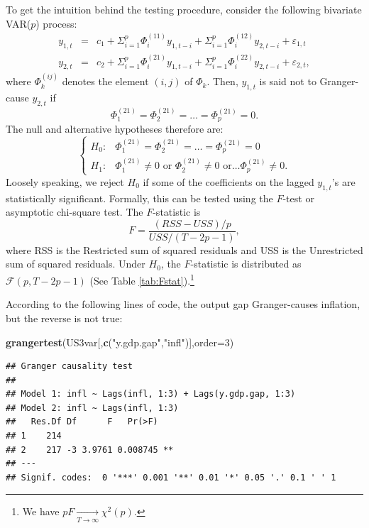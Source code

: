 \documentclass[
  12pt,
]{book}
\newenvironment{Shaded}{\begin{snugshade}}{\end{snugshade}}
\newcommand{\AttributeTok}[1]{\textcolor[rgb]{0.13,0.29,0.53}{#1}}
\newcommand{\DecValTok}[1]{\textcolor[rgb]{0.00,0.00,0.81}{#1}}
\newcommand{\FunctionTok}[1]{\textcolor[rgb]{0.13,0.29,0.53}{\textbf{#1}}}
\newcommand{\NormalTok}[1]{#1}
\newcommand{\StringTok}[1]{\textcolor[rgb]{0.31,0.60,0.02}{#1}}
\theoremstyle{definition}
\theoremstyle{definition}
\theoremstyle{definition}
\theoremstyle{definition}
\theoremstyle{remark}
\begin{document}
To get the intuition behind the testing procedure, consider the following
bivariate VAR(\(p\)) process:
\begin{eqnarray*}
y_{1,t} & = & c_1+\Sigma_{i=1}^{p}\Phi_i^{(11)}y_{1,t-i}+\Sigma_{i=1}^{p}\Phi_i^{(12)}y_{2,t-i}+\varepsilon_{1,t}\\
y_{2,t} & = & c_2+\Sigma_{i=1}^{p}\Phi_i^{(21)}y_{1,t-i}+\Sigma_{i=1}^{p}\Phi_i^{(22)}y_{2,t-i}+\varepsilon_{2,t},
\end{eqnarray*}
where \(\Phi_k^{(ij)}\) denotes the element \((i,j)\) of \(\Phi_k\). Then, \(y_{1,t}\) is said not to Granger-cause \(y_{2,t}\) if
\[
\Phi_1^{(21)}=\Phi_2^{(21)}=\ldots=\Phi_p^{(21)}=0.
\]
The null and alternative hypotheses therefore are:
\[
\begin{cases}
H_{0}: & \Phi_1^{(21)}=\Phi_2^{(21)}=\ldots=\Phi_p^{(21)}=0\\
H_{1}: & \Phi_1^{(21)}\neq0\mbox{ or }\Phi_2^{(21)}\neq0\mbox{ or}\ldots\Phi_p^{(21)}\neq0.\end{cases}
\]
Loosely speaking, we reject \(H_{0}\) if some of the coefficients on the lagged \(y_{1,t}\)'s are statistically significant. Formally, this can be tested using the \(F\)-test or asymptotic chi-square test. The \(F\)-statistic is
\[
F=\frac{(RSS-USS)/p}{USS/(T-2p-1)},
\]
where RSS is the Restricted sum of squared residuals and USS is the Unrestricted sum of squared residuals. Under \(H_{0}\), the \(F\)-statistic is distributed as \(\mathcal{F}(p,T-2p-1)\) (See Table \ref{tab:Fstat}).\footnote{We have \(pF\underset{T \rightarrow \infty}{\rightarrow}\chi^{2}(p)\).}

According to the following lines of code, the output gap Granger-causes inflation, but the reverse is not true:

\begin{Shaded}
\begin{Highlighting}[]
\FunctionTok{grangertest}\NormalTok{(US3var[,}\FunctionTok{c}\NormalTok{(}\StringTok{"y.gdp.gap"}\NormalTok{,}\StringTok{"infl"}\NormalTok{)],}\AttributeTok{order=}\DecValTok{3}\NormalTok{)}
\end{Highlighting}
\end{Shaded}

\begin{verbatim}
## Granger causality test
## 
## Model 1: infl ~ Lags(infl, 1:3) + Lags(y.gdp.gap, 1:3)
## Model 2: infl ~ Lags(infl, 1:3)
##   Res.Df Df      F   Pr(>F)   
## 1    214                      
## 2    217 -3 3.9761 0.008745 **
## ---
## Signif. codes:  0 '***' 0.001 '**' 0.01 '*' 0.05 '.' 0.1 ' ' 1
\end{verbatim}
\end{document}
